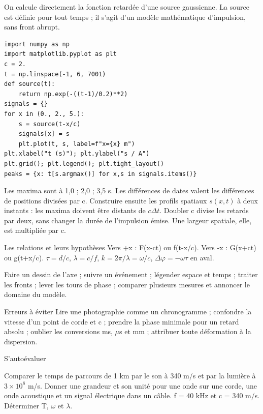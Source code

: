 On calcule directement la fonction retardée d’une source gaussienne. La source est définie pour tout temps ; il s’agit d’un modèle mathématique d’impulsion, sans front abrupt.
\begin{verbatim}
import numpy as np
import matplotlib.pyplot as plt
c = 2.
t = np.linspace(-1, 6, 7001)
def source(t):
    return np.exp(-((t-1)/0.2)**2)
signals = {}
for x in (0., 2., 5.):
    s = source(t-x/c)
    signals[x] = s
    plt.plot(t, s, label=f"x={x} m")
plt.xlabel("t (s)"); plt.ylabel("s / A")
plt.grid(); plt.legend(); plt.tight_layout()
peaks = {x: t[s.argmax()] for x,s in signals.items()}
\end{verbatim}
Les maxima sont à 1,0 ; 2,0 ; 3,5 s. Les différences de dates valent les différences de positions divisées par c. Construire ensuite les profils spatiaux $s(x,t)$ à deux instants : les maxima doivent être distants de $c\Delta t$. Doubler c divise les retards par deux, sans changer la durée de l’impulsion émise. Une largeur spatiale, elle, est multipliée par c.


\begin{loi}{Les relations et leurs hypothèses}
Vers +x : F(x-ct) ou f(t-x/c). Vers -x : G(x+ct) ou g(t+x/c). $\tau=d/c$, $\lambda=c/f$, $k=2\pi/\lambda=\omega/c$, $\Delta\varphi=-\omega\tau$ en aval.
\end{loi}
Faire un dessin de l’axe ; suivre un événement ; légender espace et temps ; traiter les fronts ; lever les tours de phase ; comparer plusieurs mesures et annoncer le domaine du modèle.
\begin{piege}{Erreurs à éviter}
Lire une photographie comme un chronogramme ; confondre la vitesse d’un point de corde et c ; prendre la phase minimale pour un retard absolu ; oublier les conversions ms, \ensuremath{\mu}s et mm ; attribuer toute déformation à la dispersion.
\end{piege}
\begin{docu}{S’autoévaluer}
\end{docu}


Comparer le temps de parcours de 1 km par le son à 340 m/s et par la lumière à $3\times10^8$ m/s.
Donner une grandeur et son unité pour une onde sur une corde, une onde acoustique et un signal électrique dans un câble.
f = 40 kHz et c = 340 m/s. Déterminer T, \ensuremath{\omega} et \ensuremath{\lambda}.


